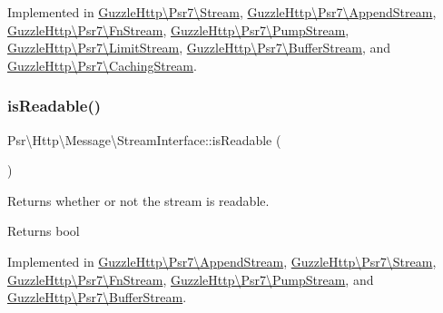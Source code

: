 Implemented in \hyperlink{classGuzzleHttp_1_1Psr7_1_1Stream_ac6f693e5cb59c136d0808117aab61396}{Guzzle\+Http\textbackslash{}\+Psr7\textbackslash{}\+Stream}, \hyperlink{classGuzzleHttp_1_1Psr7_1_1AppendStream_a72ee87e5953f8de4ccfe5af3cc45cf96}{Guzzle\+Http\textbackslash{}\+Psr7\textbackslash{}\+Append\+Stream}, \hyperlink{classGuzzleHttp_1_1Psr7_1_1FnStream_a736dbff0dbf809c32e29c9e7805ccdeb}{Guzzle\+Http\textbackslash{}\+Psr7\textbackslash{}\+Fn\+Stream}, \hyperlink{classGuzzleHttp_1_1Psr7_1_1PumpStream_a592871e85dd572d1ef3f95f6a27948e2}{Guzzle\+Http\textbackslash{}\+Psr7\textbackslash{}\+Pump\+Stream}, \hyperlink{classGuzzleHttp_1_1Psr7_1_1LimitStream_acdd9a4c2b17bfe31bb238fea5240cb5a}{Guzzle\+Http\textbackslash{}\+Psr7\textbackslash{}\+Limit\+Stream}, \hyperlink{classGuzzleHttp_1_1Psr7_1_1BufferStream_aad0e12c170462a9389ef6c5f95c71480}{Guzzle\+Http\textbackslash{}\+Psr7\textbackslash{}\+Buffer\+Stream}, and \hyperlink{classGuzzleHttp_1_1Psr7_1_1CachingStream_a4a4c0693dfcec940ea1f14c686666a4d}{Guzzle\+Http\textbackslash{}\+Psr7\textbackslash{}\+Caching\+Stream}.

\mbox{\label{interfacePsr_1_1Http_1_1Message_1_1StreamInterface_aecf78407aa241622ae200a9faa471d32}} 
\subsubsection{\texorpdfstring{is\+Readable()}{isReadable()}}
{\footnotesize\ttfamily Psr\textbackslash{}\+Http\textbackslash{}\+Message\textbackslash{}\+Stream\+Interface\+::is\+Readable (\begin{DoxyParamCaption}{ }\end{DoxyParamCaption})}

Returns whether or not the stream is readable.

\begin{DoxyReturn}{Returns}
bool 
\end{DoxyReturn}


Implemented in \hyperlink{classGuzzleHttp_1_1Psr7_1_1AppendStream_ac4f681286686c5c62838293e96734bdd}{Guzzle\+Http\textbackslash{}\+Psr7\textbackslash{}\+Append\+Stream}, \hyperlink{classGuzzleHttp_1_1Psr7_1_1Stream_aab579a16dc9a78166538a6d2d6c00e1b}{Guzzle\+Http\textbackslash{}\+Psr7\textbackslash{}\+Stream}, \hyperlink{classGuzzleHttp_1_1Psr7_1_1FnStream_a2f45ad8af60ff908f1aac72e0887452f}{Guzzle\+Http\textbackslash{}\+Psr7\textbackslash{}\+Fn\+Stream}, \hyperlink{classGuzzleHttp_1_1Psr7_1_1PumpStream_ad9122608c11bbd21d0b1476b5c8d5fa1}{Guzzle\+Http\textbackslash{}\+Psr7\textbackslash{}\+Pump\+Stream}, and \hyperlink{classGuzzleHttp_1_1Psr7_1_1BufferStream_a4c7c5d714b07099f0f765573870cc70a}{Guzzle\+Http\textbackslash{}\+Psr7\textbackslash{}\+Buffer\+Stream}.

